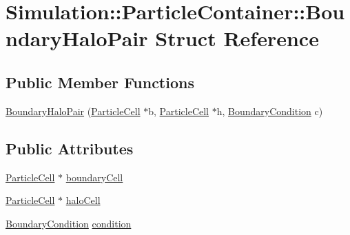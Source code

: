 \hypertarget{structSimulation_1_1ParticleContainer_1_1BoundaryHaloPair}{\section{Simulation\-:\-:Particle\-Container\-:\-:Boundary\-Halo\-Pair Struct Reference}
\label{structSimulation_1_1ParticleContainer_1_1BoundaryHaloPair}
}
\subsection*{Public Member Functions}
\begin{DoxyCompactItemize}
\item 
\hyperlink{structSimulation_1_1ParticleContainer_1_1BoundaryHaloPair_ab5c0c16c12c0711cee9695a89a54b7da}{Boundary\-Halo\-Pair} (\hyperlink{classSimulation_1_1ParticleCell}{Particle\-Cell} $\ast$b, \hyperlink{classSimulation_1_1ParticleCell}{Particle\-Cell} $\ast$h, \hyperlink{classSimulation_1_1ParticleContainer_a5e913177d570f1276e90e4d5c19029bd}{Boundary\-Condition} c)
\end{DoxyCompactItemize}
\subsection*{Public Attributes}
\begin{DoxyCompactItemize}
\item 
\hyperlink{classSimulation_1_1ParticleCell}{Particle\-Cell} $\ast$ \hyperlink{structSimulation_1_1ParticleContainer_1_1BoundaryHaloPair_a2a994d893fe6b7dbffb90868ac4bf6e0}{boundary\-Cell}
\item 
\hyperlink{classSimulation_1_1ParticleCell}{Particle\-Cell} $\ast$ \hyperlink{structSimulation_1_1ParticleContainer_1_1BoundaryHaloPair_a3d91a5200497c89b6edb925f96178991}{halo\-Cell}
\item 
\hyperlink{classSimulation_1_1ParticleContainer_a5e913177d570f1276e90e4d5c19029bd}{Boundary\-Condition} \hyperlink{structSimulation_1_1ParticleContainer_1_1BoundaryHaloPair_acedca0aebda48d951116181435da760f}{condition}
\end{DoxyCompactItemize}


